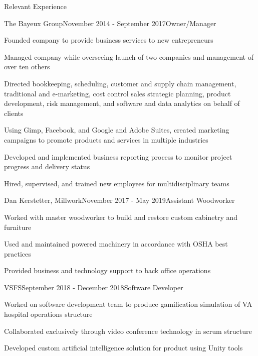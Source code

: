 \documentclass{resume} %
\begin{document}
\begin{rSection}{Relevant Experience}

\begin{rWorkSubsection}{The Bayeux Group}{November 2014 - September 2017}{Owner/Manager}{}
\item Founded company to provide business services to new entrepreneurs
\item Managed company while overseeing launch of two companies and management of over ten others
\item Directed bookkeeping, scheduling, customer and supply chain management, traditional and e-marketing, cost control sales strategic planning, product development, risk management, and software and data analytics on behalf of clients
\item Using Gimp, Facebook, and Google and Adobe Suites, created marketing campaigns to promote products and services in multiple industries
\item Developed and implemented business reporting process to monitor project progress and delivery status
\item Hired, supervised, and trained new employees for multidisciplinary teams
\end{rWorkSubsection}


\begin{rWorkSubsection}{Dan Kerstetter, Millwork}{November 2017 - May 2019}{Assistant Woodworker}{}
\item Worked with master woodworker to build and restore custom cabinetry and furniture
\item Used and maintained powered machinery in accordance with OSHA best practices
\item Provided business and technology support to back office operations
\end{rWorkSubsection}


\begin{rWorkSubsection}{VSFS}{September 2018 - December 2018}{Software Developer}{}
\item Worked on software development team to produce gamification simulation of VA hospital operations structure
\item Collaborated exclusively through video conference technology in scrum structure
\item Developed custom artificial intelligence solution for product using Unity tools
\end{rWorkSubsection}


\end{rSection}
\end{document}
